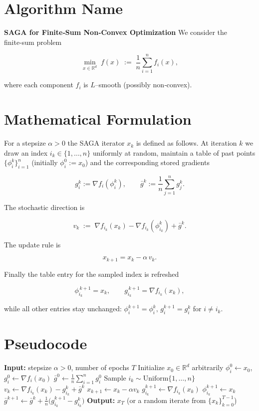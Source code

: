 \documentclass{article}
\begin{document}
\section*{Algorithm Name}
\textbf{SAGA for Finite‑Sum Non‑Convex Optimization}  
We consider the finite‑sum problem  

\[
\min_{x\in\mathbb{R}^{d}} \; f(x)\;:=\;\frac1n\sum_{i=1}^{n} f_i(x),
\tag{1}
\]

where each component $f_i$ is $L$–smooth (possibly non‑convex).  

\section*{Mathematical Formulation}
For a stepsize $\alpha>0$ the SAGA iterator $x_k$ is defined as follows.  
At iteration $k$ we draw an index $i_k\in\{1,\dots ,n\}$ uniformly at random,
maintain a table of past points $\{\phi_i^k\}_{i=1}^n$ (initially $\phi_i^0:=x_0$) and
the corresponding stored gradients  

\[
g_i^k:=\nabla f_i(\phi_i^k),\qquad 
\bar g^k:=\frac1n\sum_{j=1}^{n} g_j^k .
\tag{2}
\]

The stochastic direction is  

\[
v_k\;:=\;\nabla f_{i_k}(x_k)-\nabla f_{i_k}(\phi_{i_k}^k)+\bar g^k .
\tag{3}
\]

The update rule is  

\[
x_{k+1}=x_k-\alpha\,v_k .
\tag{4}
\]

Finally the table entry for the sampled index is refreshed  

\[
\phi_{i_k}^{\,k+1}=x_k ,\qquad 
g_{i_k}^{\,k+1}=\nabla f_{i_k}(x_k),
\tag{5}
\]

while all other entries stay unchanged:
$\phi_i^{k+1}=\phi_i^{k},\, g_i^{k+1}=g_i^{k}$ for $i\neq i_k$.

\section*{Pseudocode}
\begin{algorithm}[H]
\caption{SAGA for non‑convex finite‑sum problems}
\begin{algorithmic}[1]
\STATE \textbf{Input:} stepsize $\alpha>0$, number of epochs $T$
\STATE Initialize $x_0\in\mathbb{R}^d$ arbitrarily
    \STATE $\phi_i^{0}\gets x_0$,   $g_i^{0}\gets \nabla f_i(x_0)$
\ENDFOR
\STATE $\bar g^{0}\gets \frac1n\sum_{i=1}^{n} g_i^{0}$
    \STATE Sample $i_k\sim \text{Uniform}\{1,\dots ,n\}$
    \STATE $v_k \gets \nabla f_{i_k}(x_k)-g_{i_k}^{k}+\bar g^{k}$
    \STATE $x_{k+1}\gets x_k-\alpha v_k$
    \STATE $g_{i_k}^{k+1}\gets \nabla f_{i_k}(x_k)$
    \STATE $\phi_{i_k}^{k+1}\gets x_k$
    \STATE $\bar g^{k+1}\gets \bar g^{k}+\frac{1}{n}\bigl(g_{i_k}^{k+1}-g_{i_k}^{k}\bigr)$
\ENDFOR
\STATE \textbf{Output:} $x_T$ (or a random iterate from $\{x_k\}_{k=0}^{T-1}$)
\end{algorithmic}
\end{algorithm}
\end{document}
